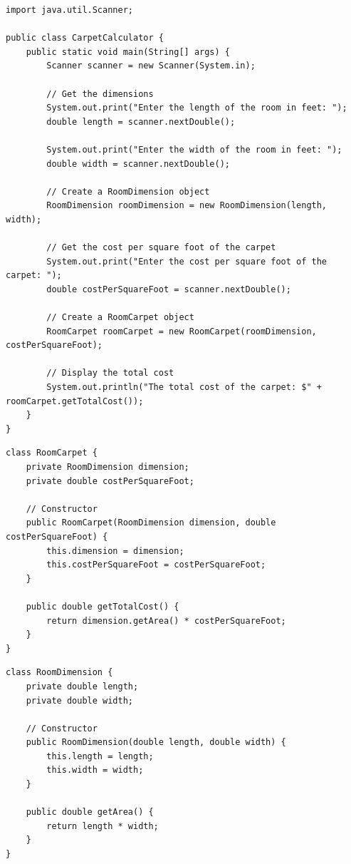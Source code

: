 \documentclass{article}
\begin{document}
\begin{lstlisting}[caption=CarpetCalculator.java]
import java.util.Scanner;

public class CarpetCalculator {
    public static void main(String[] args) {
        Scanner scanner = new Scanner(System.in);

        // Get the dimensions
        System.out.print("Enter the length of the room in feet: ");
        double length = scanner.nextDouble();

        System.out.print("Enter the width of the room in feet: ");
        double width = scanner.nextDouble();

        // Create a RoomDimension object
        RoomDimension roomDimension = new RoomDimension(length, width);

        // Get the cost per square foot of the carpet
        System.out.print("Enter the cost per square foot of the carpet: ");
        double costPerSquareFoot = scanner.nextDouble();

        // Create a RoomCarpet object
        RoomCarpet roomCarpet = new RoomCarpet(roomDimension, costPerSquareFoot);

        // Display the total cost
        System.out.println("The total cost of the carpet: $" + roomCarpet.getTotalCost());
    }
}
\end{lstlisting}

\begin{lstlisting}[caption=RoomCarpet.java]
class RoomCarpet {
    private RoomDimension dimension;
    private double costPerSquareFoot;

    // Constructor
    public RoomCarpet(RoomDimension dimension, double costPerSquareFoot) {
        this.dimension = dimension;
        this.costPerSquareFoot = costPerSquareFoot;
    }

    public double getTotalCost() {
        return dimension.getArea() * costPerSquareFoot;
    }
}
\end{lstlisting}

\begin{lstlisting}[caption=RoomDimension.java]
class RoomDimension {
    private double length;
    private double width;

    // Constructor
    public RoomDimension(double length, double width) {
        this.length = length;
        this.width = width;
    }

    public double getArea() {
        return length * width;
    }
}
\end{lstlisting}
\end{document}
